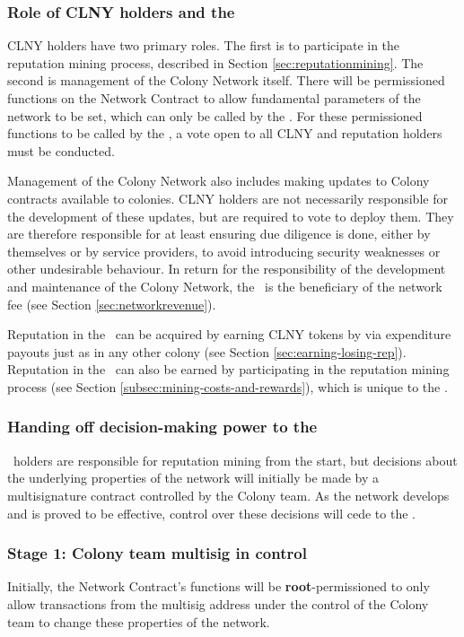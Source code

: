 \subsubsection{Role of CLNY holders and the \rc}

CLNY holders have two primary roles. The first is to participate in the reputation mining process, described in Section \ref{sec:reputationmining}. The second is management of the Colony Network itself. There will be permissioned functions on the Network Contract to allow fundamental parameters of the network to be set, which can only be called by the \rc. For these permissioned functions to be called by the \rc, a vote open to all CLNY and reputation holders must be conducted.

Management of the Colony Network also includes making updates to Colony contracts available to colonies. CLNY holders are not necessarily responsible for the development of these updates, but are required to vote to deploy them. They are therefore responsible for at least ensuring due diligence is done, either by themselves or by service providers, to avoid introducing security weaknesses or other undesirable behaviour. In return for the responsibility of the development and maintenance of the Colony Network, the \rc\ is the beneficiary of the network fee (see Section \ref{sec:networkrevenue}).

Reputation in the \rc\ can be acquired by earning CLNY tokens by via expenditure payouts just as in any other colony (see Section \ref{sec:earning-losing-rep}). Reputation in the \rc\ can also be earned by participating in the reputation mining process (see Section \ref{subsec:mining-costs-and-rewards}), which is unique to the \rc.

\subsubsection{Handing off decision-making power to the \rc}\label{subsec:ceding-control-to-rc}

\rct\ holders are responsible for reputation mining from the start, but decisions about the underlying properties of the network will initially be made by a multisignature contract controlled by the Colony team. As the network develops and is proved to be effective, control over these decisions will cede to the \rc.

\subsubsection*{Stage 1: Colony team multisig in control}
 Initially, the Network Contract's functions will be \textbf{root}-permissioned to only allow transactions from the multisig address under the control of the Colony team to change these properties of the network.

